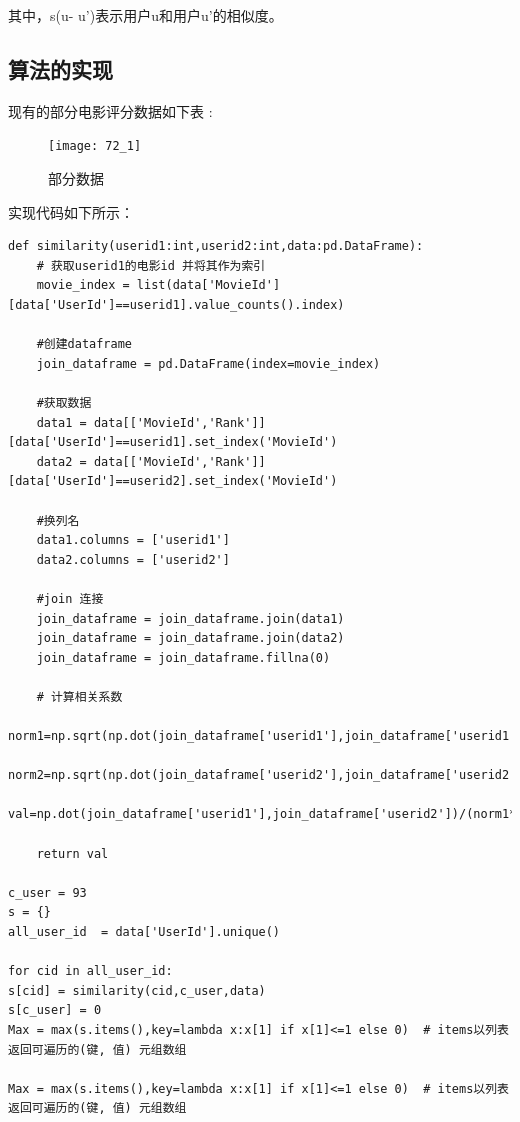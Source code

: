 \documentclass[withoutpreface,bwprint]{cumcmthesis} %
\begin{document}
其中，s(u- u')表示用户u和用户u'的相似度。
\subsection{算法的实现}
\par 现有的部分电影评分数据如下表 :
\begin{figure}[H]
	\centering
	\centerline{\texttt{[image: 72\_1]}}  
	\begin{center}
		\caption{部分数据}
	\end{center}
\end{figure}
\par 实现代码如下所示：
\begin{lstlisting}
def similarity(userid1:int,userid2:int,data:pd.DataFrame):
	# 获取userid1的电影id 并将其作为索引
	movie_index = list(data['MovieId'][data['UserId']==userid1].value_counts().index)
	
	#创建dataframe
	join_dataframe = pd.DataFrame(index=movie_index)
	
	#获取数据
	data1 = data[['MovieId','Rank']][data['UserId']==userid1].set_index('MovieId')
	data2 = data[['MovieId','Rank']][data['UserId']==userid2].set_index('MovieId')
	
	#换列名
	data1.columns = ['userid1']
	data2.columns = ['userid2']
	
	#join 连接
	join_dataframe = join_dataframe.join(data1)
	join_dataframe = join_dataframe.join(data2)
	join_dataframe = join_dataframe.fillna(0)
	
	# 计算相关系数
	norm1=np.sqrt(np.dot(join_dataframe['userid1'],join_dataframe['userid1']))
	norm2=np.sqrt(np.dot(join_dataframe['userid2'],join_dataframe['userid2']))
	val=np.dot(join_dataframe['userid1'],join_dataframe['userid2'])/(norm1*norm2)
	
	return val
	
c_user = 93
s = {}
all_user_id  = data['UserId'].unique()

for cid in all_user_id:
s[cid] = similarity(cid,c_user,data)
s[c_user] = 0
Max = max(s.items(),key=lambda x:x[1] if x[1]<=1 else 0)  # items以列表返回可遍历的(键, 值) 元组数组

Max = max(s.items(),key=lambda x:x[1] if x[1]<=1 else 0)  # items以列表返回可遍历的(键, 值) 元组数组

\end{lstlisting}
\end{document}
